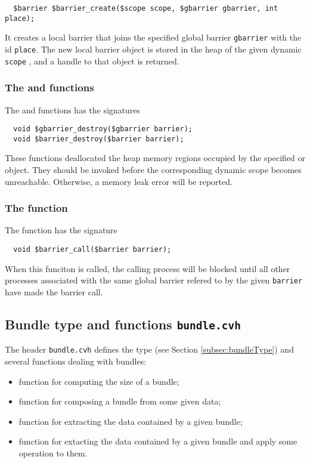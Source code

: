 \begin{verbatim}
  $barrier $barrier_create($scope scope, $gbarrier gbarrier, int place);
\end{verbatim}

It creates a local barrier that joins the specified global barrier \texttt{gbarrier} with the id \texttt{place}. The new local barrier object is stored in the heap of the given dynamic \texttt{scope} , and a handle to that object is returned.

\subsubsection{The  \cgbarrierdestroy{} and \cbarrierdestroy{} functions}

The \cgbarrierdestroy{} and \cbarrierdestroy{}  functions has the signatures

\begin{verbatim}
  void $gbarrier_destroy($gbarrier barrier);
  void $barrier_destroy($barrier barrier);
\end{verbatim}

These functions deallocated the heap memory regions occupied by the specified \cgbarrier{} or \cbarrier{} object. They should be invoked before the corresponding dynamic scope becomes unreachable. Otherwise, a memory leak error will be reported.

\subsubsection{The  \cbarriercall{} function}

The \cbarriercall{} function has the signature

\begin{verbatim}
  void $barrier_call($barrier barrier);
\end{verbatim}

When this funciton is called, the calling process will be blocked until all other processes associated with the same global barrier refered to by the given \texttt{barrier} have made the barrier call.

\subsection{Bundle type and functions \texttt{bundle.cvh}}
\label{subsec:bundleLibrary}

The header \texttt{bundle.cvh} defines the type \cbundle{} (see Section \ref{subsec:bundleType}) and several functions dealing with bundles:
\begin{itemize}
\item function \cbundlesize{} for computing the size of a bundle;
\item function \cbundlepack{} for composing a bundle from some given data;
\item function \cbundleunpack{} for extracting the data contained by a given bundle;
\item function \cbundleunpackapply{} for extacting the data contained by a given bundle and apply some operation to them.
\end{itemize}

